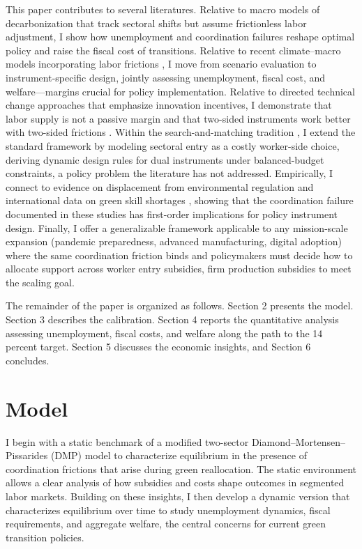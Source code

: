 \documentclass[preprint,12pt]{elsarticle}
\begin{document}
This paper contributes to several literatures. Relative to macro models of decarbonization that track sectoral shifts but assume frictionless labor adjustment, I show how unemployment and coordination failures reshape optimal policy and raise the fiscal cost of transitions. Relative to recent climate–macro models incorporating labor frictions \citep{hafstead2018,hafstead2022,castellanos2024ulmcp}, I move from scenario evaluation to instrument-specific design, jointly assessing unemployment, fiscal cost, and welfare—margins crucial for policy implementation. Relative to directed technical change approaches that emphasize innovation incentives, I demonstrate that labor supply is not a passive margin and that two-sided instruments work better with two-sided frictions \citep{acemoglu2012environment,acemoglu2016transition,aghion2016carbon}. Within the search-and-matching tradition \citep{mortensen1994, pissarides2000}, I extend the standard framework by modeling sectoral entry as a costly worker-side choice, deriving dynamic design rules for dual instruments under balanced-budget constraints, a policy problem the literature has not addressed. Empirically, I connect to evidence on displacement from environmental regulation \citep{walker2011environmental, walker2013transitional, shapiro2023, curtis2018restat} and international data on green skill shortages \citep{ilo2019skills,BluedornHansen2022,iea2023wee,oecd2023skills,irena2023jobs}, showing that the coordination failure documented in these studies has first-order implications for policy instrument design. Finally, I offer a generalizable framework applicable to any mission-scale expansion (pandemic preparedness, advanced manufacturing, digital adoption) where the same coordination friction binds and policymakers must decide how to allocate support across worker entry subsidies, firm production subsidies to meet the scaling goal.

The remainder of the paper is organized as follows. Section 2 presents the model. Section 3 describes the calibration. Section 4 reports the quantitative analysis assessing unemployment, fiscal costs, and welfare along the path to the 14 percent target. Section 5 discusses the economic insights, and Section 6 concludes.

\section{Model}

I begin with a static benchmark of a modified two-sector Diamond--Mortensen--Pissarides (DMP) model to characterize equilibrium in the presence of coordination frictions that arise during green reallocation. The static environment allows a clear analysis of how subsidies and costs shape outcomes in segmented labor markets. Building on these insights, I then develop a dynamic version that characterizes equilibrium over time to study unemployment dynamics, fiscal requirements, and aggregate welfare, the central concerns for current green transition policies.
\end{document}
